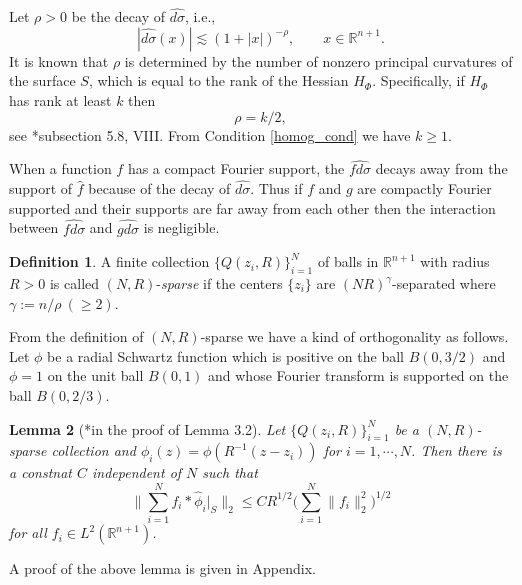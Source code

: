 \documentclass[11pt,reqno]{amsart}
\theoremstyle{plain}
\newtheorem{thm}{Theorem}[section]
\newtheorem{lem}[thm]{Lemma}
\theoremstyle{definition}
\newtheorem{defn}[thm]{Definition}
\theoremstyle{remark}
\numberwithin{equation}{section}
\begin{document}
%
Let $\rho>0$ be the decay of $\widehat{d\sigma}$, i.e.,
\begin{equation} \label{surdecay}
|\widehat{d\sigma}(x)| \lesssim (1+|x|)^{-\rho}, \qquad x \in \mathbb R^{n+1}.
\end{equation}
It is known that $\rho$ is determined by the number of nonzero principal curvatures of the surface $S$, which is equal to the rank of the Hessian $H_{\Phi}$. Specifically, if $H_{\Phi}$ has rank at least $k$ then
\[
\rho = k/2,
\]
see \cite{St}*{subsection 5.8, VIII}. From Condition \ref{homog_cond} we have $k \ge 1$.

When a function $f$ has a compact Fourier support, the $\widehat{fd\sigma}$ decays away from the support of $\hat f$ because of the decay of $\widehat{d\sigma}$. Thus if $f$ and $g$ are compactly Fourier supported and their supports are far away from each other then the interaction between $\widehat{fd\sigma}$ and $\widehat{gd\sigma}$ is negligible. 
\begin{defn}
A finite collection $\{Q(z_i,R)\}_{i=1}^{N}$ of balls in $\mathbb{R}^{n+1}$ with radius $R>0$ is called  $(N,R)$-\textit{sparse} if the centers $\{z_i\}$ are $(NR)^\gamma$-separated where $\gamma := n/\rho~ (\ge 2)$. 
\end{defn}

From the definition of $(N,R)$-sparse we have a kind of orthogonality as follows. Let $\phi$ be a radial Schwartz function which is positive on the ball $B(0,3/2)$ and $\phi = 1$ on the unit ball $B(0,1)$ and whose Fourier transform is supported on the ball $B(0,2/3)$. 

\begin{lem}[\cite{T1}*{in the proof of Lemma 3.2}]  \label{lem:spase_decp}
Let $\{Q(z_i,R)\}_{i=1}^{N}$ be a $(N,R)$-sparse collection 
and $\phi_i(z)=\phi(R^{-1}(z-z_i))$ for $i=1,\cdots, N$. Then there is a constnat $C$ independent of $N$ such that
\begin{equation} \label{eqn:dep}
\Big\| \sum_{i=1}^{N} f_i \ast \hat \phi_i \big|_S  \Big\|_2 \le CR^{1/2} \Big( \sum_{i=1}^{N} \|f_i\|_2^2 \Big)^{1/2}
\end{equation}
for all $f_i \in L^2(\mathbb R^{n+1})$.
\end{lem}
A proof of the above lemma is given in Appendix. 
\end{document}
